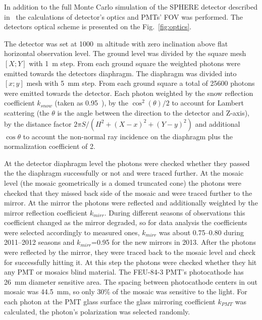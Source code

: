 \documentclass[final,5p,times,twocolumn]{elsarticle}
\begin{document}
In addition to the full Monte Carlo simulation of the SPHERE detector described in~\cite{Ant19} the calculations of detector's optics and PMTs' FOV was performed. The detectors optical scheme is presented on the Fig.~\ref{fig:optics}. 

The detector was set at 1000~m altitude with zero inclination above flat horizontal observation level. The ground level was divided by the square mesh $[X;Y]$ with 1~m step. From each ground square the weighted photons were emitted towards the detectors diaphragm. The diaphragm was divided into $[x;y]$ mesh with 5~mm step. From each ground square a total of 25600 photons were emitted towards the detector. Each photon weighted by the snow reflection coefficient $k_{snow}$ (taken as 0.95~\cite{war82}), by the $\cos^2(\theta)/2$ to account for Lambert scattering (the $\theta$ is the angle between the direction to the detector and Z-axis), by the distance factor $2\pi{}S/(H^2+(X-x)^2+(Y-y)^2)$ and additional $\cos\theta$ to account the non-normal ray incidence on the diaphragm {\color{red}plus} the normalization coefficient of 2.

At the detector diaphragm level the photons were checked whether they passed the the diaphragm successfully or not and were traced further. At the mosaic level (the mosaic geometrically is a domed truncated cone) the photons were checked that they missed back side of the mosaic and were traced further to the mirror. At the mirror the photons were reflected and additionally weighted by the mirror reflection coefficient $k_{mirr}$. During different seasons of observations this coefficient changed as the mirror degraded, so for data analysis the coefficients were selected accordingly to {\color{red} measured ones}, $k_{mirr}$ was about 0.75--0.80 during 2011--2012 seasons and $k_{mirr}$=0.95 for the new mirrors in 2013. After the photons were reflected by the mirror, they were traced back to the mosaic level and check for successfully hitting it. At this step the photons were checked whether they hit any PMT or mosaics blind material. The \mbox{FEU-84-3} PMT's photocathode has 26~mm diameter sensitive area. The spacing between photocathode centers in out mosaic was 44.5~mm, so only 30\% of the mosaic was sensitive to the light. For each photon at the PMT glass surface the glass mirroring coefficient $k_{PMT}$ was calculated, the photon's polarization was selected randomly.
\end{document}
